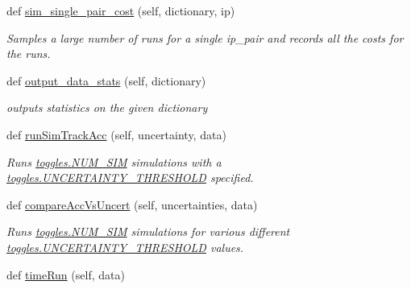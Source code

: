 \begin{DoxyCompactItemize}
def \mbox{\hyperlink{classdynamicfilterapp_1_1test__simulations_1_1_simulation_test_ab5877dcfa377b2f010b303cd51a65a66}{sim\+\_\+single\+\_\+pair\+\_\+cost}} (self, dictionary, ip)
\begin{DoxyCompactList}\small\item\em Samples a large number of runs for a single ip\+\_\+pair and records all the costs for the runs. \end{DoxyCompactList}\item 
def \mbox{\hyperlink{classdynamicfilterapp_1_1test__simulations_1_1_simulation_test_a14e5b04778a7da945a93584f40e1e8bd}{output\+\_\+data\+\_\+stats}} (self, dictionary)
\begin{DoxyCompactList}\small\item\em outputs statistics on the given dictionary \end{DoxyCompactList}\item 
def \mbox{\hyperlink{classdynamicfilterapp_1_1test__simulations_1_1_simulation_test_a87a8325e13e3f2641a3371a9c72c9583}{run\+Sim\+Track\+Acc}} (self, uncertainty, data)
\begin{DoxyCompactList}\small\item\em Runs \mbox{\hyperlink{namespacedynamicfilterapp_1_1toggles_a3baf5565851cd87736238d8dddfc1106}{toggles.\+N\+U\+M\+\_\+\+S\+IM}} simulations with a \mbox{\hyperlink{namespacedynamicfilterapp_1_1toggles_aaefdc27b85545eb4a910f5c65f7d8bbb}{toggles.\+U\+N\+C\+E\+R\+T\+A\+I\+N\+T\+Y\+\_\+\+T\+H\+R\+E\+S\+H\+O\+LD}} specified. \end{DoxyCompactList}\item 
def \mbox{\hyperlink{classdynamicfilterapp_1_1test__simulations_1_1_simulation_test_a1395b2cd07f422278160348baec14c9b}{compare\+Acc\+Vs\+Uncert}} (self, uncertainties, data)
\begin{DoxyCompactList}\small\item\em Runs \mbox{\hyperlink{namespacedynamicfilterapp_1_1toggles_a3baf5565851cd87736238d8dddfc1106}{toggles.\+N\+U\+M\+\_\+\+S\+IM}} simulations for various different \mbox{\hyperlink{namespacedynamicfilterapp_1_1toggles_aaefdc27b85545eb4a910f5c65f7d8bbb}{toggles.\+U\+N\+C\+E\+R\+T\+A\+I\+N\+T\+Y\+\_\+\+T\+H\+R\+E\+S\+H\+O\+LD}} values. \end{DoxyCompactList}\item 
def \mbox{\hyperlink{classdynamicfilterapp_1_1test__simulations_1_1_simulation_test_a6977d93287474dfe398931c8c0b381c3}{time\+Run}} (self, data)

\end{DoxyCompactItemize}
